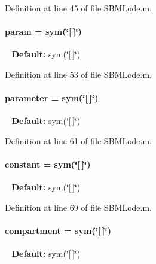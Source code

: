 Definition at line 45 of file S\+B\+M\+Lode.\+m.

\hypertarget{class_s_b_m_lode_a51f20d6b1b54a2eee3be0e8adc96a0ae}{}
\paragraph[{param}]{\setlength{\rightskip}{0pt plus 5cm}param = sym(\char`\"{}\mbox{[}$\,$\mbox{]}\char`\"{})}\label{class_s_b_m_lode_a51f20d6b1b54a2eee3be0e8adc96a0ae}
~\newline
{\bfseries Default\+:} sym(\char`\"{}\mbox{[}$\,$\mbox{]}\char`\"{}) 

Definition at line 53 of file S\+B\+M\+Lode.\+m.

\hypertarget{class_s_b_m_lode_a0d71b5c1dcca8d3fee88d6a11d3e2071}{}
\paragraph[{parameter}]{\setlength{\rightskip}{0pt plus 5cm}parameter = sym(\char`\"{}\mbox{[}$\,$\mbox{]}\char`\"{})}\label{class_s_b_m_lode_a0d71b5c1dcca8d3fee88d6a11d3e2071}
~\newline
{\bfseries Default\+:} sym(\char`\"{}\mbox{[}$\,$\mbox{]}\char`\"{}) 

Definition at line 61 of file S\+B\+M\+Lode.\+m.

\hypertarget{class_s_b_m_lode_a391f14c28a859734cd091e4e521bb8f8}{}
\paragraph[{constant}]{\setlength{\rightskip}{0pt plus 5cm}constant = sym(\char`\"{}\mbox{[}$\,$\mbox{]}\char`\"{})}\label{class_s_b_m_lode_a391f14c28a859734cd091e4e521bb8f8}
~\newline
{\bfseries Default\+:} sym(\char`\"{}\mbox{[}$\,$\mbox{]}\char`\"{}) 

Definition at line 69 of file S\+B\+M\+Lode.\+m.

\hypertarget{class_s_b_m_lode_a70729d905c114f8f08b3507f20806dd2}{}
\paragraph[{compartment}]{\setlength{\rightskip}{0pt plus 5cm}compartment = sym(\char`\"{}\mbox{[}$\,$\mbox{]}\char`\"{})}\label{class_s_b_m_lode_a70729d905c114f8f08b3507f20806dd2}
~\newline
{\bfseries Default\+:} sym(\char`\"{}\mbox{[}$\,$\mbox{]}\char`\"{}) 

